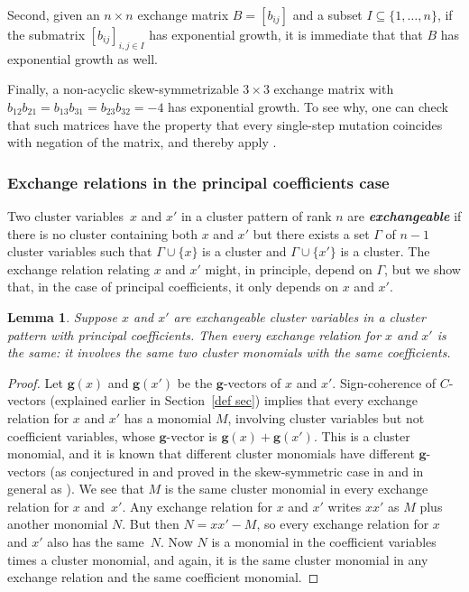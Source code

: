 \documentclass{amsart}
\newtheorem{lemma}[proposition]{Lemma}
\theoremstyle{definition}
\theoremstyle{remark}
\numberwithin{equation}{section}
\newcommand{\newword}[1]{\textbf{\emph{#1}}}
\newcommand{\set}[1]{{\lbrace #1 \rbrace}}
\newcommand{\0}{{\mathbf{0}}}
\newcommand{\g}{\mathbf{g}}
\begin{document}
Second, given an $n\times n$ exchange matrix $B=[b_{ij}]$ and a subset $I\subseteq\set{1,\ldots,n}$, if the submatrix $[b_{ij}]_{i,j\in I}$ has exponential growth, it is immediate that that $B$ has exponential growth as well.

Finally, a non-acyclic skew-symmetrizable $3\times3$ exchange matrix with $b_{12}b_{21}=b_{13}b_{31}=b_{23}b_{32}=-4$ has exponential growth.
To see why, one can check that such matrices have the property that every single-step mutation coincides with negation of the matrix, and thereby apply \cite[Theorem~1.1]{FeShThTu12}.

\subsubsection{Exchange relations in the principal coefficients case}\label{exch rel sec}
Two cluster variables~$x$ and $x'$ in a cluster pattern of rank $n$  are \newword{exchangeable} if there is no cluster containing both $x$ and $x'$ but there exists a set $\Gamma$ of $n-1$ cluster variables such that $\Gamma\cup\set{x}$ is a cluster and $\Gamma\cup\set{x'}$ is a cluster.
The exchange relation relating $x$ and $x'$ might, in principle, depend on $\Gamma$, but we show that, in the case of principal coefficients, it only depends on $x$ and $x'$.

\begin{lemma}\label{exch ind}  
Suppose $x$ and $x'$ are exchangeable cluster variables in a cluster pattern with principal coefficients.
Then every exchange relation for $x$ and $x'$ is the same:
it involves the same two cluster monomials with the same coefficients.
\end{lemma}

\begin{proof}
Let $\g(x)$ and $\g(x')$ be the $\g$-vectors of $x$ and $x'$.
Sign-coherence of $C$-vectors (explained earlier in Section~\ref{def sec}) implies that every exchange relation for $x$ and $x'$ has a monomial $M$, involving cluster variables but not coefficient variables, whose $\g$-vector is $\g(x)+\g(x')$.
This is a cluster monomial, and it is known that different cluster monomials have different $\g$-vectors (as conjectured in \cite[Conjecture~7.10]{ca4} and proved in the skew-symmetric case in \cite{CIKLFP} and in general as \cite[Theorem~2.13]{GHKK}).
We see that $M$ is the same cluster monomial in every exchange relation for $x$ and~$x'$.
Any exchange relation for $x$ and $x'$ writes $xx'$ as $M$ plus another monomial $N$.
But then $N=xx'-M$, so every exchange relation for $x$ and $x'$ also has the same~$N$.
Now $N$ is a monomial in the coefficient variables times a cluster monomial, and again, it is the same cluster monomial in any exchange relation and the same coefficient monomial.
\end{proof}
\end{document}
